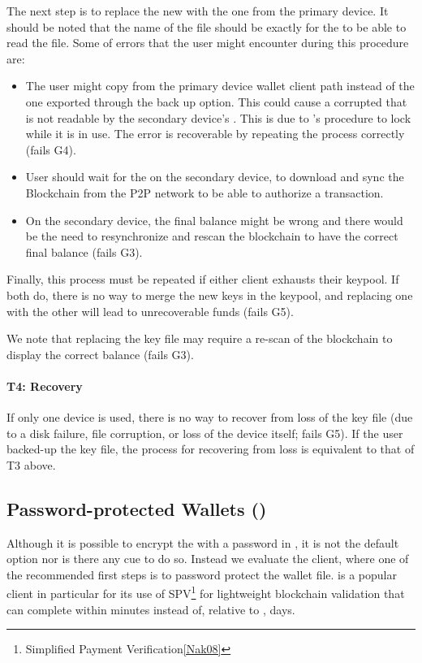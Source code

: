 The next step is to replace the new \walletfile with the one from the primary device. It should be noted that the name of the file should be exactly \walletfile for the \bitcoinclient to be able to read the file. Some of errors that the user might encounter during this procedure are:
\begin{itemize}
	\item The user might copy \walletfile from the primary device wallet client path instead of the one exported through the back up option. This could cause a corrupted \walletfile that is not readable by the secondary device's \bitcoinclient. This is due to \bitcoinclient's procedure to lock \walletfile while it is in use. The error is recoverable by repeating the process correctly (fails G4). 
	\item User should wait for the \bitcoinclient on the secondary device, to download and sync the Blockchain from the P2P network to be able to authorize a transaction.
	\item On the secondary device, the final balance might be wrong and there would be the need to resynchronize and rescan the blockchain to have the correct final balance (fails G3).
\end{itemize}

Finally, this process must be repeated if either client exhausts their keypool. If both do, there is no way to merge the new keys in the keypool, and replacing one \walletfile with the other will lead to unrecoverable funds (fails G5). 

We note that replacing the key file may require  a re-scan of the blockchain to display the correct balance (fails G3).

\paragraph{T4: Recovery} If only one device is used, there is no way to recover from loss of the key file (\eg due to a disk failure, file corruption, or loss of the device itself; fails G5). If the user backed-up the key file, the process for recovering from loss is equivalent to that of T3 above. 


\subsection{Password-protected Wallets (\multibit)}
Although it is possible to encrypt the \walletfile with a password in \bitcoinclient, it is not the default option nor is there any cue to do so. Instead we evaluate the \multibit client, where one of the recommended first steps is to password protect the wallet file. \multibit is a popular client in particular for its use of SPV\footnote{Simplified Payment Verification\ref{Nak08}} for lightweight blockchain validation that can complete within minutes instead of, relative to \bitcoinclient, days.


